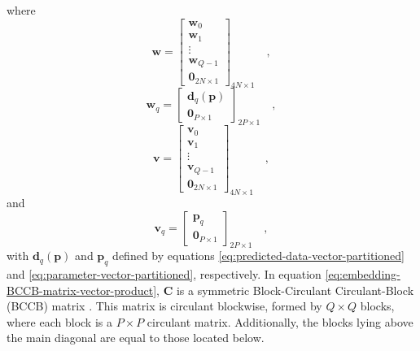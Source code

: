 \documentclass[manuscript,revised]{geophysics}
\begin{document}
where
\begin{equation}
\mathbf{w} = \begin{bmatrix}
\mathbf{w}_{0} \\
\mathbf{w}_{1} \\
\vdots \\
\mathbf{w}_{Q - 1} \\
\mathbf{0}_{2N \times 1}
\end{bmatrix}_{4N \times 1} \quad ,
\label{eq:w-vector}
\end{equation}
\begin{equation}
\mathbf{w}_{q} = \begin{bmatrix}
\mathbf{d}_{q}(\mathbf{p}) \\
\mathbf{0}_{P \times 1}
\end{bmatrix}_{2P \times 1}
\label{eq:wq-vector} \quad ,
\end{equation}
\begin{equation}
\mathbf{v} = \begin{bmatrix}
\mathbf{v}_{0} \\
\mathbf{v}_{1} \\
\vdots \\
\mathbf{v}_{Q - 1} \\
\mathbf{0}_{2N \times 1}
\end{bmatrix}_{4N \times 1} \quad ,
\label{eq:v-vector}
\end{equation}
and
\begin{equation}
\mathbf{v}_{q} = \begin{bmatrix}
\mathbf{p}_{q} \\
\mathbf{0}_{P \times 1}
\end{bmatrix}_{2P \times 1}
\label{eq:vq-vector} \quad ,
\end{equation}
with $\mathbf{d}_{q}(\mathbf{p})$ and $\mathbf{p}_{q}$ defined by
equations \ref{eq:predicted-data-vector-partitioned} and 
\ref{eq:parameter-vector-partitioned}, respectively.
In equation \ref{eq:embedding-BCCB-matrix-vector-product}, $\mathbf{C}$ is a 
symmetric Block-Circulant Circulant-Block (BCCB) matrix \citep[][ p. 184]{davis1979}.
This matrix is circulant blockwise, formed by $Q \times Q$ blocks, where
each block is a $P \times P$ circulant matrix. Additionally, the blocks lying 
above the main diagonal are equal to those located below.
\end{document}

